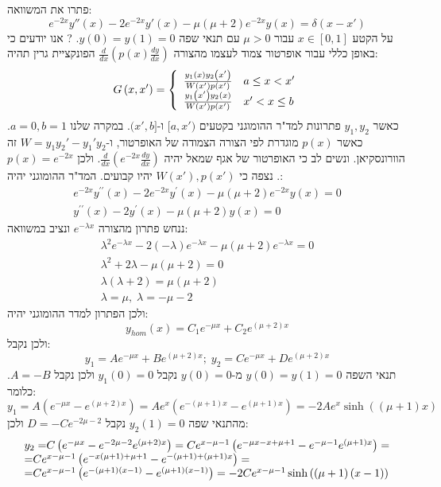 \documentclass{tstextbook}
\begin{document}
פתרו את המשוואה:
$$e^{-2x}y''(x)-2e^{-2x}y'(x)-\mu\left( \mu+2 \right)e^{-2x}y(x)=\delta(x-x')$$
על הקטע \(x \in [0,1]\) עבור \(\mu>0\) עם תנאי שפה \(y(0)=y(1)=0\). 
?
אנו יודעים כי באופן כללי עבור אופרטור צמוד לעצמו מהצורה \(\frac{d}{dx}\left( p(x) \frac{dy}{dx} \right)\) הפונקציית גרין תהיה:
$$G\left(x,x^{\prime}\right)={\left\{\begin{array}{l l}{{\frac{y_{1}\left(x\right)y_{2}\left(x^{\prime}\right)}{W\left(x^{\prime}\right)p\left(x^{\prime}\right)}}}&{a\leq x<x^{\prime}}\\ {{\frac{y_{1}\left(x^{\prime}\right)y_{2}\left(x\right)}{W\left(x^{\prime}\right)p\left(x^{\prime}\right)}}}&{x^{\prime}<x\leq b}\end{array}\right.}$$
כאשר \(y_{1},y_{2}\) פתרונות למד"ר ההומוגני בקטעים \([a,x')\) ו-\((x',b]\). במקרה שלנו \(a=0,b=1\). כאשר \(p(x)\) מוגדרת לפי הצורה הצמודה של האופרטור, ו-\(W=y_{1}y_{2}'-y_{1}'y_{2}\) זה הוורונסקיאן. ונשים לב כי האופרטור של אגף שמאל יהיה \(\frac{d}{dx}\left( e^{-2x} \frac{dy}{dx} \right)\). ולכן \(p(x)=e^{-2x}\). נצפה כי \(W(x'),p(x')\) יהיו קבועים.
המד"ר ההומוגני יהיה:
$$\begin{array}{c}{{e^{-2x}y^{\prime\prime}\left(x\right)-2e^{-2x}y^{\prime}\left(x\right)-\mu\left(\mu+2\right)e^{-2x}y\left(x\right)=0}}\\ {{y^{\prime\prime}\left(x\right)-2y^{\prime}\left(x\right)-\mu\left(\mu+2\right)y\left(x\right)=0}}\end{array}$$
ננחש פתרון מהצורה \(e^{-\lambda x}\) ונציב במשוואה:
$$\begin{array}{c}{{\lambda^{2}e^{-\lambda x}-2\left(-\lambda\right)e^{-\lambda x}-\mu\left(\mu+2\right)e^{-\lambda x}=0}}\\ {{\lambda^{2}+2\lambda-\mu\left(\mu+2\right)=0}}\\ {{\lambda\left(\lambda+2\right)=\mu\left(\mu+2\right)}}\\ {{\lambda=\mu,\;\lambda=-\mu-2}}\end{array}$$
ולכן הפתרון למדר ההומוגני יהיה:
$$y_{h o m}\left(x\right)=C_{1}e^{-\mu x}+C_{2}e^{\left(\mu+2\right)x}$$
ולכן נקבל:
$$y_{1}=A e^{-\mu x}+B e^{(\mu+2)x};\;y_{2}=C e^{-\mu x}+D e^{(\mu+2)x}$$
תנאי השפה \(y(0)=y(1)=0\) מ-\(y(0)=0\) נקבל \(y_{1}(0)=0\) ולכן נקבל \(A=-B\). כלומר:
$$y_{1}=A\left(e^{-\mu x}-e^{(\mu+2)x}\right)=A e^{x}\left(e^{-(\mu+1)x}-e^{(\mu+1)x}\right)=-2A e^{x}\sinh\left(\left(\mu+1\right)x\right)$$
מהתנאי שפה \(y_{2}(1)=0\) נקבל \(D=-Ce^{-2\mu-2}\) ולכן:
$$\begin{array}{l l}{{y_{2}=}C\left(e^{-\mu x}-e^{-2\mu-2}e^{\left(\mu+2\right)x}\right)=C e^{x-\mu-1}\left(e^{-\mu x-x+\mu+1}-e^{-\mu-1}e^{\left(\mu+1\right)x}\right)=}\\ {{=}C e^{x-\mu-1}\left(e^{-x\left(\mu+1\right)+\mu+1}-e^{-\left(\mu+1\right)+\left(\mu+1\right)x}\right)=}\\ {{=}C e^{x-\mu-1}\left(e^{-\left(\mu+1\right)\left(x-1\right)}-e^{\left(\mu+1\right)\left(x-1\right)}\right)=-2C e^{x-\mu-1}\sinh\left(\left(\mu+1\right)\left(x-1\right)\right)}\end{array}$$
\end{document}
